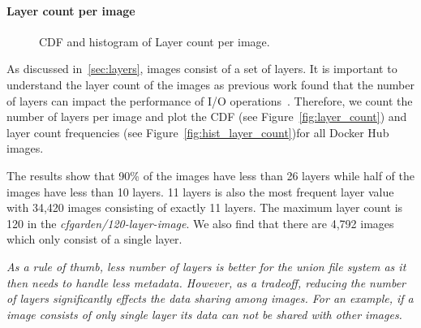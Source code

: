 \paragraph{Layer count per image}

\begin{figure}[!t]
	\centering
	\caption{CDF and histogram of Layer count per image.}
	\label{fig:image-size}
\end{figure}

As discussed in~\ref{sec:layers}, images consist of a set of layers.
It is important to understand the layer count of the images as previous
work found that the number of layers can impact the performance of
I/O operations~\cite{slacker}. Therefore, we count the number of layers
per image and plot the CDF (see Figure~\ref{fig:layer_count})
and layer count frequencies (see Figure~\ref{fig:hist_layer_count})for all
Docker Hub images.

The results show that 90\% of the images have less than 26 layers while
half of the images have less than 10 layers. 11 layers is also the most
frequent layer value with 34,420 images consisting of exactly 11 layers.
The maximum layer count is 120 in the \textit{cfgarden/120-layer-image}.
We also find that there are 4,792 images which only consist of a single layer.

\emph{As a rule of thumb, less number of layers is better for the union file
	system as it then needs to handle less metadata. However, as a tradeoff,
	reducing the number of layers significantly effects the data sharing among images.
	For an example, if a image consists of only single layer its data can not be shared
	with other images.}
%

